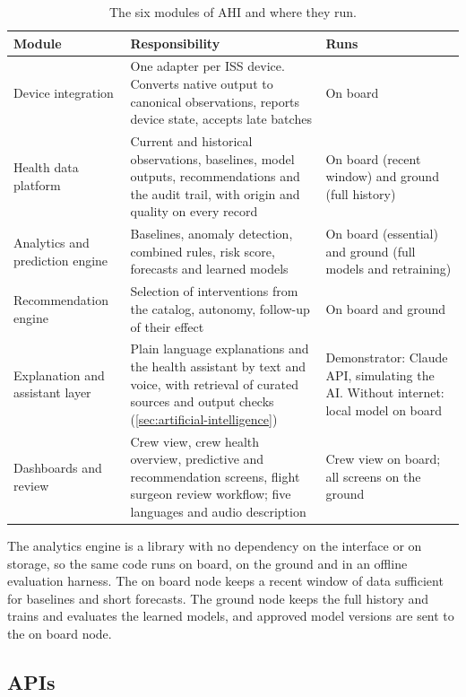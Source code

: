 \begin{table}[htbp]
\centering
\vspace{0.8em}
\caption{The six modules of AHI and where they run.}
\label{tab:components}
\small
\begin{tabular}{p{3.2cm}p{7.4cm}p{3.4cm}}
\hline
\textbf{Module} & \textbf{Responsibility} & \textbf{Runs} \\
\hline
Device integration & One adapter per ISS device. Converts native output to canonical observations, reports device state, accepts late batches & On board \\
Health data platform & Current and historical observations, baselines, model outputs, recommendations and the audit trail, with origin and quality on every record & On board (recent window) and ground (full history) \\
Analytics and prediction engine & Baselines, anomaly detection, combined rules, risk score, forecasts and learned models & On board (essential) and ground (full models and retraining) \\
Recommendation engine & Selection of interventions from the catalog, autonomy, follow-up of their effect & On board and ground \\
Explanation and assistant layer & Plain language explanations and the health assistant by text and voice, with retrieval of curated sources and output checks (\ref{sec:artificial-intelligence}) & Demonstrator: Claude API, simulating the AI. Without internet: local model on board \\
Dashboards and review & Crew view, crew health overview, predictive and recommendation screens, flight surgeon review workflow; five languages and audio description & Crew view on board; all screens on the ground \\
\hline
\end{tabular}
\vspace{1.2em}
\end{table}

The analytics engine is a library with no dependency on the interface or on storage, so the same code runs on board, on the ground and in an offline evaluation harness. The on board node keeps a recent window of data sufficient for baselines and short forecasts. The ground node keeps the full history and trains and evaluates the learned models, and approved model versions are sent to the on board node.

\subsection{APIs}
\label{subsec:apis}

